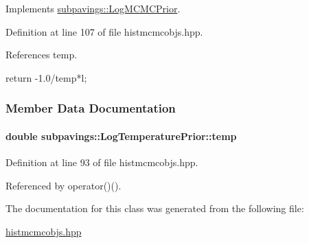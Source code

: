 \-Implements \hyperlink{classsubpavings_1_1LogMCMCPrior_ae53e146f9ac1b057ae9df4370220a22d}{subpavings\-::\-Log\-M\-C\-M\-C\-Prior}.



\-Definition at line 107 of file histmcmcobjs.\-hpp.



\-References temp.


\begin{DoxyCode}
    {
        return -1.0/temp*l;

    }
\end{DoxyCode}


\subsubsection{\-Member \-Data \-Documentation}
\hypertarget{classsubpavings_1_1LogTemperaturePrior_a161fe5fa916de9250535f5b9f86811b6}{
\paragraph[{temp}]{\setlength{\rightskip}{0pt plus 5cm}double {\bf subpavings\-::\-Log\-Temperature\-Prior\-::temp}}}\label{classsubpavings_1_1LogTemperaturePrior_a161fe5fa916de9250535f5b9f86811b6}


\-Definition at line 93 of file histmcmcobjs.\-hpp.



\-Referenced by operator()().



\-The documentation for this class was generated from the following file\-:\begin{DoxyCompactItemize}
\item 
\hyperlink{histmcmcobjs_8hpp}{histmcmcobjs.\-hpp}\end{DoxyCompactItemize}
